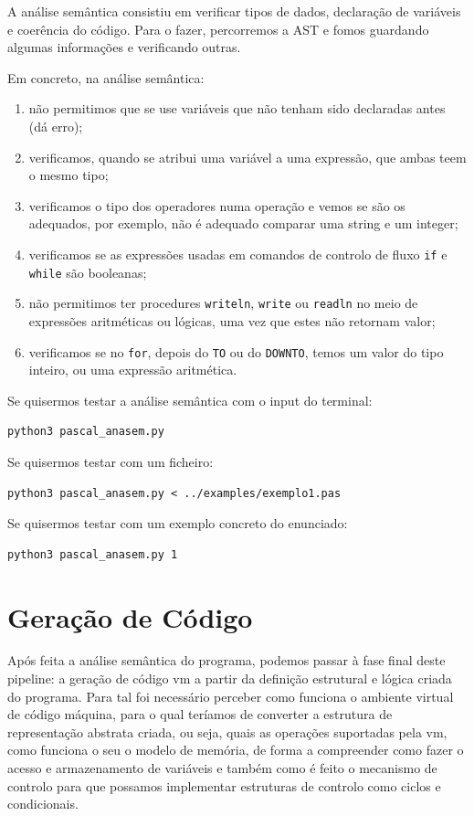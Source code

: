 \documentclass[12pt,a4paper]{report}
\begin{document}
A análise semântica consistiu em verificar tipos de dados, declaração de variáveis e coerência do código. Para o fazer, percorremos a AST e fomos guardando algumas informações
e verificando outras.

Em concreto, na análise semântica:
\begin{enumerate}
    \item não permitimos que se use variáveis que não tenham sido declaradas antes (dá erro);
    \item verificamos, quando se atribui uma variável a uma expressão, que ambas teem o mesmo tipo;
    \item verificamos o tipo dos operadores numa operação e vemos se são os adequados, por exemplo, não é adequado comparar uma string e um integer;
    \item verificamos se as expressões usadas em comandos de controlo de fluxo \texttt{if} e \texttt{while} são booleanas;
    \item não permitimos ter procedures \texttt{writeln}, \texttt{write} ou \texttt{readln} no meio de expressões aritméticas ou lógicas, uma vez que estes não retornam valor;
    \item verificamos se no \texttt{for}, depois do \texttt{TO} ou do \texttt{DOWNTO}, temos um valor do tipo inteiro, ou uma expressão aritmética.
\end{enumerate}

\vspace{1em}

Se quisermos testar a análise semântica com o input do terminal:
\begin{verbatim}
python3 pascal_anasem.py
\end{verbatim}

Se quisermos testar com um ficheiro:
\begin{verbatim}
python3 pascal_anasem.py < ../examples/exemplo1.pas
\end{verbatim}

Se quisermos testar com um exemplo concreto do enunciado:
\begin{verbatim}
python3 pascal_anasem.py 1
\end{verbatim}

\chapter{Geração de Código}

Após feita a análise semântica do programa, podemos passar à fase final deste pipeline: a geração de código vm a partir da definição estrutural e lógica criada do programa.
Para tal foi necessário perceber como funciona o ambiente virtual de código máquina, para o qual teríamos de converter a estrutura de representação abstrata criada, ou seja,
quais as operações suportadas pela vm, como funciona o seu o modelo de memória, de forma a compreender como fazer o acesso e armazenamento de variáveis e também como é feito o mecanismo de controlo
para que possamos implementar estruturas de controlo como ciclos e condicionais.
\end{document}
